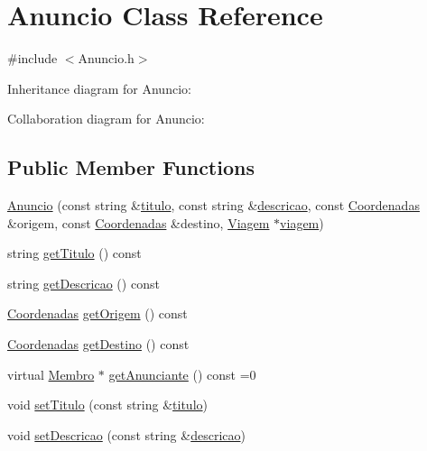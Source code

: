 \hypertarget{class_anuncio}{\section{Anuncio Class Reference}
\label{class_anuncio}
}


{\ttfamily \#include $<$Anuncio.\+h$>$}



Inheritance diagram for Anuncio\+:


Collaboration diagram for Anuncio\+:
\subsection*{Public Member Functions}
\begin{DoxyCompactItemize}
\item 
\hyperlink{class_anuncio_a5589ef34bbed97fe7ab10ccdcbbd66a1}{Anuncio} (const string \&\hyperlink{class_anuncio_adb34bedd8220f42b9ee37662c21313e6}{titulo}, const string \&\hyperlink{class_anuncio_aa6a9eb8d08cb06d16061b006eb2c8b97}{descricao}, const \hyperlink{class_coordenadas}{Coordenadas} \&origem, const \hyperlink{class_coordenadas}{Coordenadas} \&destino, \hyperlink{class_viagem}{Viagem} $\ast$\hyperlink{class_anuncio_aa225374a19420f56f5abc258d96b691a}{viagem})
\item 
string \hyperlink{class_anuncio_af712423e3645f7127f987d88793127d4}{get\+Titulo} () const 
\item 
string \hyperlink{class_anuncio_a693f59391a620851b4ac37063e8f4af4}{get\+Descricao} () const 
\item 
\hyperlink{class_coordenadas}{Coordenadas} \hyperlink{class_anuncio_a4a0c6be721a7fe4351cd5fa06b8bafcd}{get\+Origem} () const 
\item 
\hyperlink{class_coordenadas}{Coordenadas} \hyperlink{class_anuncio_a207905709390f67bb9546e4d94682bb5}{get\+Destino} () const 
\item 
virtual \hyperlink{class_membro}{Membro} $\ast$ \hyperlink{class_anuncio_a7650797534a2eaa7d24fe5a2c2889d14}{get\+Anunciante} () const =0
\item 
void \hyperlink{class_anuncio_af95db56a1347160ef1cf53ea1ec659a6}{set\+Titulo} (const string \&\hyperlink{class_anuncio_adb34bedd8220f42b9ee37662c21313e6}{titulo})
\item 
void \hyperlink{class_anuncio_a8746d4708c5622947b17385414320e88}{set\+Descricao} (const string \&\hyperlink{class_anuncio_aa6a9eb8d08cb06d16061b006eb2c8b97}{descricao})
\item 

\end{DoxyCompactItemize}
